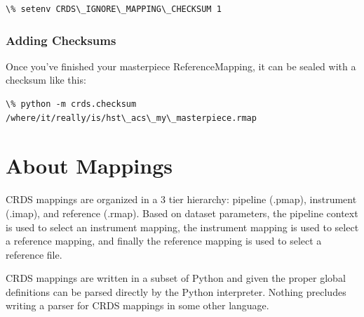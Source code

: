 \documentclass[letterpaper,10pt,english]{sphinxmanual}
\begin{document}
\begin{Verbatim}[commandchars=\\\{\}]
\% setenv CRDS\_IGNORE\_MAPPING\_CHECKSUM 1
\end{Verbatim}


\subsection{Adding Checksums}
\label{core_library_functions:adding-checksums}
Once you've finished your masterpiece ReferenceMapping,  it can be sealed with
a checksum like this:

\begin{Verbatim}[commandchars=\\\{\}]
\% python -m crds.checksum /where/it/really/is/hst\_acs\_my\_masterpiece.rmap
\end{Verbatim}


\chapter{About Mappings}
\label{rmap_syntax:about-mappings}\label{rmap_syntax::doc}
CRDS mappings are organized in a 3 tier hierarchy:  pipeline (.pmap),
instrument (.imap), and reference (.rmap).   Based on dataset parameters,
the pipeline context is used to select an instrument mapping,  the instrument
mapping is used to select a reference mapping,  and finally the reference
mapping is used to select a reference file.

CRDS mappings are written in a subset of Python and given the proper global
definitions can be parsed directly by the Python interpreter.   Nothing
precludes writing a parser for CRDS mappings in some other language.
\begin{figure}[htbp]
\centering

\end{figure}
\end{document}
